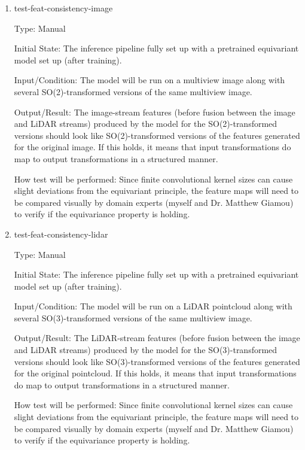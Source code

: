 \documentclass[12pt, titlepage]{article}
\begin{document}
\begin{enumerate}

  \item{test-feat-consistency-image\\}
  
  Type: Manual
            
  Initial State: The inference pipeline fully set up with a pretrained equivariant model set up (after training). 

  Input/Condition: The model will be run on a multiview image along with several SO(2)-transformed versions of the same multiview image.

  Output/Result: The image-stream features (before fusion between the image and LiDAR streams) produced by the model for the SO(2)-transformed versions should look like SO(2)-transformed versions of the features generated for the original image. If this holds, it means that input transformations do map to output transformations in a structured manner.

  How test will be performed: Since finite convolutional kernel sizes can cause slight deviations from the equivariant principle, the feature maps will need to be compared visually by domain experts (myself and Dr. Matthew Giamou) to verify if the equivariance property is holding.

  \item{test-feat-consistency-lidar\\}
  
  Type: Manual
            
  Initial State: The inference pipeline fully set up with a pretrained equivariant model set up (after training).

  Input/Condition: The model will be run on a LiDAR pointcloud along with several SO(3)-transformed versions of the same multiview image.

  Output/Result: The LiDAR-stream features (before fusion between the image and LiDAR streams) produced by the model for the SO(3)-transformed versions should look like SO(3)-transformed versions of the features generated for the original pointcloud. If this holds, it means that input transformations do map to output transformations in a structured manner.

  How test will be performed: Since finite convolutional kernel sizes can cause slight deviations from the equivariant principle, the feature maps will need to be compared visually by domain experts (myself and Dr. Matthew Giamou) to verify if the equivariance property is holding.


\end{enumerate}
\end{document}
